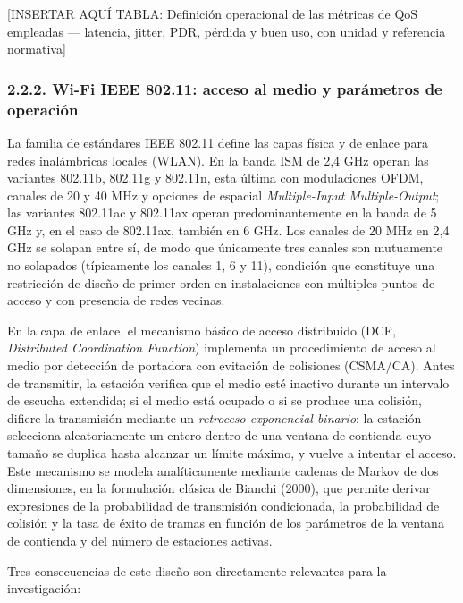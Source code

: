 \documentclass[
  12pt,
]{article}
\begin{document}
{[}INSERTAR AQUÍ TABLA: Definición operacional de las métricas de QoS
empleadas — latencia, jitter, PDR, pérdida y buen uso, con unidad y
referencia normativa{]}

\subsubsection{2.2.2. Wi-Fi IEEE 802.11: acceso al medio y parámetros de
operación}\label{wi-fi-ieee-802.11-acceso-al-medio-y-paruxe1metros-de-operaciuxf3n}

La familia de estándares IEEE 802.11 define las capas física y de enlace
para redes inalámbricas locales (WLAN). En la banda ISM de 2,4 GHz
operan las variantes 802.11b, 802.11g y 802.11n, esta última con
modulaciones OFDM, canales de 20 y 40 MHz y opciones de espacial
\emph{Multiple-Input Multiple-Output}; las variantes 802.11ac y 802.11ax
operan predominantemente en la banda de 5 GHz y, en el caso de 802.11ax,
también en 6 GHz. Los canales de 20 MHz en 2,4 GHz se solapan entre sí,
de modo que únicamente tres canales son mutuamente no solapados
(típicamente los canales 1, 6 y 11), condición que constituye una
restricción de diseño de primer orden en instalaciones con múltiples
puntos de acceso y con presencia de redes vecinas.

En la capa de enlace, el mecanismo básico de acceso distribuido (DCF,
\emph{Distributed Coordination Function}) implementa un procedimiento de
acceso al medio por detección de portadora con evitación de colisiones
(CSMA/CA). Antes de transmitir, la estación verifica que el medio esté
inactivo durante un intervalo de escucha extendida; si el medio está
ocupado o si se produce una colisión, difiere la transmisión mediante un
\emph{retroceso exponencial binario}: la estación selecciona
aleatoriamente un entero dentro de una ventana de contienda cuyo tamaño
se duplica hasta alcanzar un límite máximo, y vuelve a intentar el
acceso. Este mecanismo se modela analíticamente mediante cadenas de
Markov de dos dimensiones, en la formulación clásica de Bianchi (2000),
que permite derivar expresiones de la probabilidad de transmisión
condicionada, la probabilidad de colisión y la tasa de éxito de tramas
en función de los parámetros de la ventana de contienda y del número de
estaciones activas.

Tres consecuencias de este diseño son directamente relevantes para la
investigación:
\end{document}
